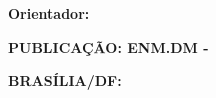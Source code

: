 
\begin{folhadeaprovacao}

\thispagestyle{empty}
\setcounter{page}{1}
\begin{center}
	{\normalsize \textbf{
		\MakeUppercase\imprimirinstituicao\\
		\MakeUppercase\imprimirfaculdade\\
		\MakeUppercase\imprimirdepartamento}}
	
	\vfill
	
	{\large \textbf{\MakeUppercase\imprimirtitulo}}
		
	\vfill
	
	{\large \textbf{\imprimirautor}}
	
	\vspace{20mm}
	
	{\normalsize \textbf{Orientador: \imprimirorientador}}
	
	\vspace{20mm}
	
	{\normalsize \textbf{\MakeUppercase\imprimirtipotrabalho}}
	
	\vspace{10mm}
	
	{\normalsize \textbf{PUBLICA\c{C}\~{A}O: ENM.DM - \imprimircdu}}
	
	
	\vspace{10mm}
	
	{\normalsize \textbf{BRASÍLIA/DF: \imprimirdata}}
\end{center}

\pagebreak

%

\begin{center}
	{\normalsize \textbf{\MakeUppercase\imprimirinstituicao}}\\
	{\normalsize \textbf{\MakeUppercase\imprimirfaculdade}}\\
	{\normalsize \textbf{\MakeUppercase\imprimirdepartamento}}\\
	
	\vspace{10mm}
	{\large \textbf{\imprimirtitulo}}
	

\end{center}
\end{folhadeaprovacao}
